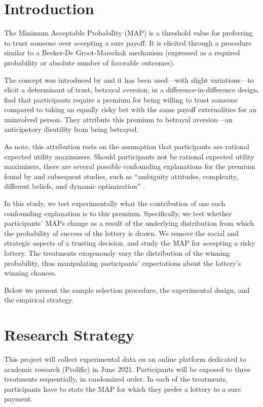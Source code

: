 \section{Introduction}
The Minimum Acceptable Probability (MAP) is a threshold value for preferring to trust someone over accepting a sure payoff.
It is elicited through a procedure similar to a Becker-De Groot-Marschak mechanism \citep{Becker1964} (expressed as a required probability or absolute number of favorable outcomes).

The concept was introduced by \cite{Bohnet2004} and it has been used—with slight variations—to elicit a determinant of trust, betrayal aversion, in a difference-in-difference design.
\cite{Bohnet2004} find that participants require a premium for being willing to trust someone compared to taking an equally risky bet with the same payoff externalities for an uninvolved person.
They attribute this premium to betrayal aversion---an anticipatory disutility from being betrayed.

As \cite{Li2020a} note, this attribution rests on the assumption that participants are rational expected utility maximizers.
Should participants not be rational expected utility maximizers, there are several possible confounding explanations for the premium found by \cite{Bohnet2004} and subsequent studies, such as ``ambiguity attitudes, complexity, different beliefs, and dynamic optimization'' \citep[p.~275]{Li2020a}.

In this study, we test experimentally what the contribution of one such confounding explanation is to this premium.
Specifically, we test whether participants' MAPs change as a result of the underlying distribution from which the probability of success of the lottery is drawn.
We remove the social and strategic aspects of a trusting decision, and study the MAP for accepting a risky lottery.
The treatments exogenously vary the distribution of the winning probability, thus manipulating participants’ expectations about the lottery’s winning chances.


Below we present the sample selection procedure, the experimental design, and the empirical strategy.



\section{Research Strategy}
This project will collect experimental data on an online platform dedicated to academic research (Prolific) in June 2021. Participants will be exposed to three treatments sequentially, in randomized order.
In each of the treatments, participants have to state the MAP for which they prefer a lottery to a sure payment.

